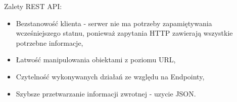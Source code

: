 Zalety REST API:
\begin{itemize}
    \item Bezstanowość klienta - serwer nie ma potrzeby zapamiętywania wcześniejszego statnu, ponieważ zapytania HTTP zawierają wszystkie potrzebne informacje,
    \item Łatwość manipulowania obiektami z poziomu URL,
    \item Czytelność wykonywanych działań ze względu na Endpointy,
    \item Szybsze przetwarzanie informacji zwrotnej - uzycie JSON.
\end{itemize}